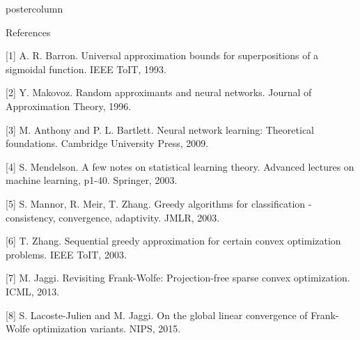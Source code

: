 \documentclass{beamer}
\begin{document}
\begin{frame}
\begin{columns}
\begin{column}{.37\textwidth}
\begin{beamercolorbox}[center]{postercolumn}
\begin{minipage}{.98\textwidth}
{\vspace{-0.2ex}
\begin{myblock}{References}
\vspace{-0.8ex}
\footnotesize{
[1] A. R. Barron. Universal approximation bounds for superpositions of a sigmoidal function. IEEE ToIT, 1993.

[2] Y. Makovoz. Random approximants and neural networks. Journal of Approximation Theory, 1996.

[3] M. Anthony and P. L. Bartlett. Neural network learning: Theoretical foundations. Cambridge University Press, 2009.

[4] S. Mendelson. A few notes on statistical learning theory. Advanced lectures on machine learning, p1-40. Springer, 2003.

[5] S. Mannor, R. Meir, T. Zhang. Greedy algorithms for classification - consistency, convergence, adaptivity. JMLR, 2003.

[6] T. Zhang. Sequential greedy approximation for certain convex optimization problems. IEEE ToIT, 2003.

[7] M. Jaggi. Revisiting Frank-Wolfe: Projection-free sparse convex optimization. ICML, 2013.

[8] S. Lacoste-Julien and M. Jaggi. On the global linear convergence of Frank-Wolfe optimization variants. NIPS, 2015.
}
%
%
\end{myblock}\vfill


}\end{minipage}\end{beamercolorbox}
\end{column}

\end{columns}
\end{frame}
\end{document}
